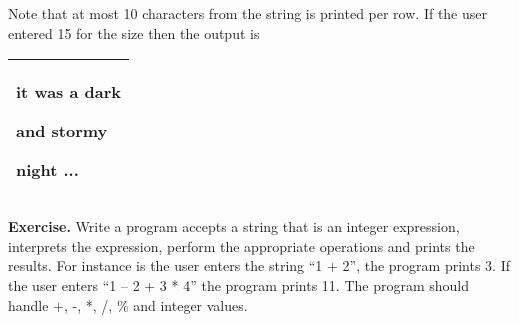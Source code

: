 \documentclass[
]{article}
\begin{document}
Note that at most 10 characters from the string is printed per row. If
the user entered 15 for the size then the output is

\begin{longtable}[]{@{}l@{}}
\toprule
\endhead
\begin{minipage}[t]{0.97\columnwidth}\raggedright
it was a dark

and stormy

night ...\strut
\end{minipage}\tabularnewline
\bottomrule
\end{longtable}

\textbf{Exercise.} Write a program accepts a string that is an integer
expression, interprets the expression, perform the appropriate
operations and prints the results. For instance is the user enters the
string ``1 + 2'', the program prints 3. If the user enters ``1 -- 2 + 3
* 4'' the program prints 11. The program should handle +, -, *, /, \%
and integer values.
\end{document}
